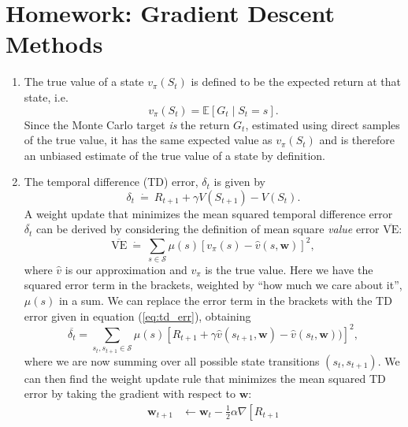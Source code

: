 \documentclass{article}
\begin{document}
\section*{Homework: Gradient Descent Methods}
\begin{enumerate}
	\item The true value of a state $v_\pi(S_t)$ is defined to be the expected return at that state,
	      i.e.
	      \begin{equation}
		      v_\pi(S_t) = \mathbb{E}\left[ G_t \mid S_t = s \right].
	      \end{equation}
	      Since the Monte Carlo target \textit{is} the return $G_t$, estimated using direct samples of
	      the true value, it has the same expected value as $v_\pi(S_t)$ and is therefore an unbiased
	      estimate of the true value of a state by definition.
	\item The temporal difference (TD) error, $\delta_t$ is given by
	      \begin{equation}
		      \delta_t ~\dot{=}~ R_{t+1} + \gamma V(S_{t+1}) - V(S_t).\label{eq:td_err}
	      \end{equation}
	      A weight update that minimizes the mean squared temporal difference error
	      $\overline{\delta_t}$ can be derived by considering the definition of mean square
	      \textit{value} error $\overline{\text{VE}}$:
	      \begin{equation}
		      \overline{\text{VE}} ~ \dot{=} ~ \sum_{s \in \mathcal{S}} \mu(s) \left[v_\pi(s)
			      - \hat{v}(s, \mathbf{w})\right]^2,
	      \end{equation}
	      where $\hat{v}$ is our approximation and $v_\pi$ is the true value. Here we have the squared
	      error term in the brackets, weighted by ``how much we care about it'', $\mu(s)$ in a sum. We
	      can replace the error term in the brackets with the TD error given in equation
	      (\ref{eq:td_err}), obtaining
	      \begin{equation}
		      \overline{\delta_t} = \sum_{s_t, s_{t+1} \in \mathcal{S}} \mu(s) \left[R_{t+1} + \gamma
			      \hat{v}(s_{t+1}, \mathbf{w}) - \hat{v}(s_t, \mathbf{w}))\right]^2,
	      \end{equation}
	      where we are now summing over all possible state transitions $(s_t, s_{t+1})$.  We can then
	      find the weight update rule that minimizes the mean squared TD error by taking the gradient
	      with respect to $\mathbf{w}$:
	      \begin{align*}
		      \mathbf{w}_{t+1} & \leftarrow \mathbf{w}_t - \frac{1}{2} \alpha \nabla\left[R_{t+1}

\end{align*}
\end{enumerate}
\end{document}
